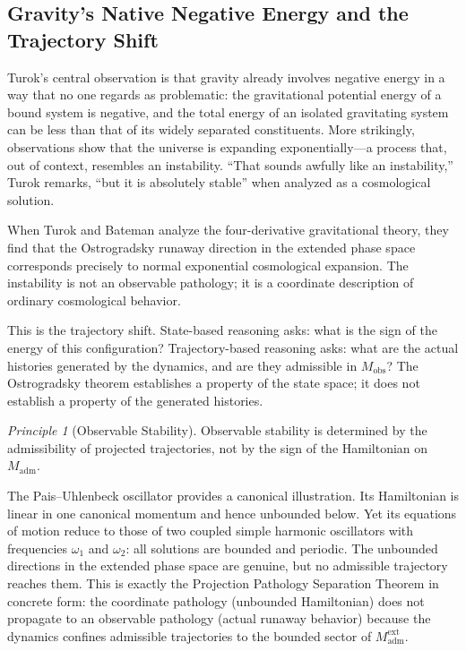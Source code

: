 \documentclass[12pt,a4paper]{article}
\theoremstyle{remark}
\newtheorem{principle}{Principle}[section]
\begin{document}
\subsection{Gravity's Native Negative Energy and the Trajectory Shift}

Turok's central observation is that gravity already involves negative
energy in a way that no one regards as problematic: the gravitational
potential energy of a bound system is negative, and the total energy of
an isolated gravitating system can be less than that of its widely
separated constituents. More strikingly, observations show that the
universe is expanding exponentially---a process that, out of context,
resembles an instability. ``That sounds awfully like an instability,''
Turok remarks, ``but it is absolutely stable'' when analyzed as a
cosmological solution.

When Turok and Bateman analyze the four-derivative gravitational theory,
they find that the Ostrogradsky runaway direction in the extended phase
space corresponds precisely to normal exponential cosmological expansion.
The instability is not an observable pathology; it is a coordinate
description of ordinary cosmological behavior.

This is the trajectory shift. State-based reasoning asks: what is the sign
of the energy of this configuration? Trajectory-based reasoning asks: what
are the actual histories generated by the dynamics, and are they admissible
in $M_{\mathrm{obs}}$? The Ostrogradsky theorem establishes a property of
the state space; it does not establish a property of the generated histories.

\begin{principle}[Observable Stability]
Observable stability is determined by the admissibility of projected
trajectories, not by the sign of the Hamiltonian on $M_{\mathrm{adm}}$.
\end{principle}

The Pais--Uhlenbeck oscillator provides a canonical illustration. Its
Hamiltonian is linear in one canonical momentum and hence unbounded below.
Yet its equations of motion reduce to those of two coupled simple harmonic
oscillators with frequencies $\omega_1$ and $\omega_2$: all solutions
are bounded and periodic. The unbounded directions in the extended phase
space are genuine, but no admissible trajectory reaches them. This is
exactly the Projection Pathology Separation Theorem in concrete form: the
coordinate pathology (unbounded Hamiltonian) does not propagate to an
observable pathology (actual runaway behavior) because the dynamics
confines admissible trajectories to the bounded sector of $M_{\mathrm{adm}}^{\mathrm{ext}}$.
\end{document}
